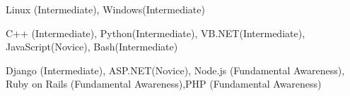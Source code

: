 \begin{cventries}
  \cventry
    {Linux (Intermediate), Windows(Intermediate)}
    {}
    {}
    {}
    {}
\end{cventries}
  \begin{cventries}
  \cventry
    {C++ (Intermediate), Python(Intermediate), VB.NET(Intermediate), JavaScript(Novice), Bash(Intermediate)}
    {}
    {}
    {}
    {}
\end{cventries}
  \begin{cventries}
  \cventry
    {Django (Intermediate), ASP.NET(Novice), Node.js (Fundamental Awareness), Ruby on Rails (Fundamental Awareness),PHP (Fundamental Awareness)}
    {}
    {}
    {}
    {}
\end{cventries}